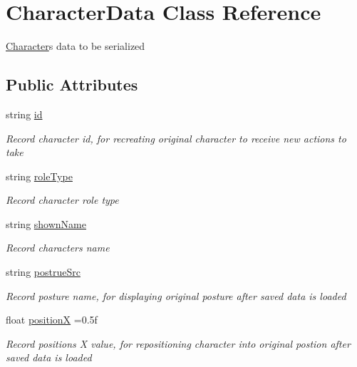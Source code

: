 \hypertarget{class_character_data}{}\section{Character\+Data Class Reference}
\label{class_character_data}


\hyperlink{class_character}{Character}\textquotesingle{}s data to be serialized  


\subsection*{Public Attributes}
\begin{DoxyCompactItemize}
\item 
string \hyperlink{class_character_data_a46d22a0d14d6ca879ee16de3a7b0e5db}{id}
\begin{DoxyCompactList}\small\item\em Record character id, for recreating original character to receive new actions to take \end{DoxyCompactList}\item 
string \hyperlink{class_character_data_adff8e0b4b56c8123fb1b95bd8c1df94c}{role\+Type}
\begin{DoxyCompactList}\small\item\em Record character role type \end{DoxyCompactList}\item 
string \hyperlink{class_character_data_ae229e19f27feb544571c27cb527ed4f4}{shown\+Name}
\begin{DoxyCompactList}\small\item\em Record character\textquotesingle{}s name \end{DoxyCompactList}\item 
string \hyperlink{class_character_data_a82646c36b7e8870ac63de55244bb439f}{postrue\+Src}
\begin{DoxyCompactList}\small\item\em Record posture name, for displaying original posture after saved data is loaded \end{DoxyCompactList}\item 
float \hyperlink{class_character_data_a6cc49ea64576b0b23f29fd9a697d3426}{positionX} =0.\+5f
\begin{DoxyCompactList}\small\item\em Record position\textquotesingle{}s X value, for repositioning character into original postion after saved data is loaded \end{DoxyCompactList}\item 

\end{DoxyCompactItemize}
